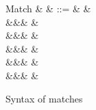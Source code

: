 \begin{figure}
\begin{syntaxfig}
\mbox{Match}
&
\xi
&
::=
&
&
\\
&&&
\matchUnit{\matchHole{}}
&
\\
&&&
\matchSumL{\xi}{\sigma}
&
\\
&&&
\matchSumR{\sigma}{\xi}
&
\\
&&&
&
\\
&&&
\matchRoll{\xi}
&
\end{syntaxfig}
\caption{Syntax of matches}
\end{figure}
